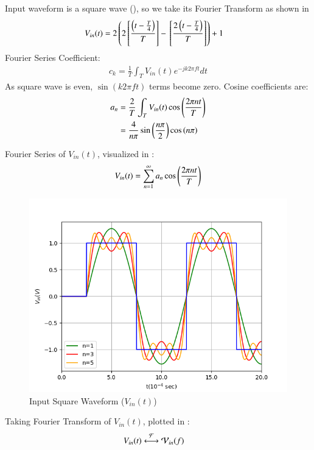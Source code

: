 \documentclass[journal,12pt,twocolumn]{IEEEtran}
\theoremstyle{remark}
\begin{document}
\solution


Input waveform is a square wave (), so we take its Fourier Transform as shown in 
\begin{align}
    V_{in}(t) &= 2\left(2{}\left[\frac{\left(t-\frac{T}{4}\right)}{T}\right] - {}\left[\frac{2\left(t - \frac{T}{4}\right)}{T}\right]\right) + 1
\end{align}
Fourier Series Coefficient:
\begin{align}
    c_k = \frac{1}{T} \int_{T} V_{in}(t)e^{-jk2\pi ft}dt
\end{align}
As square wave is even, $\sin(k2\pi ft)$ terms become zero. Cosine coefficients are:
\begin{align}
    a_n &= \frac{2}{T} \int_{T} V_{in}(t) \cos\left(\frac{2\pi nt}{T}\right)\\
    &= \frac{4}{n\pi}\sin{\ensuremath{\left(\frac{n\pi}{2}\right)}}\cos\left({n\pi}\right)
\end{align}

Fourier Series of $V_{in}(t)$, visualized in :
\begin{align}
    V_{in}(t) = \sum_{n = 1}^{\infty}a_n \cos\left(\frac{2\pi nt}{T}\right)
\end{align}

\begin{figure}[!h]
    \centering
    \includegraphics[width = \columnwidth]{figs/f_s.png}
    \caption{Input Square Waveform ($V_{in}(t)$)}
    \label{fig:square_gate.ph.23.37}
\end{figure}

Taking Fourier Transform of $V_{in}(t)$, plotted in :
\begin{align}
    V_{in}(t) &\system{F} \mathcal{V}_{in}(f)
\end{align}
\end{document}
